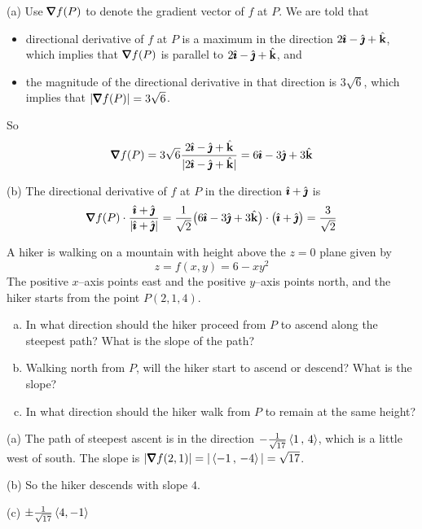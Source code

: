 \begin{solution}
(a)  Use $\vnabla f(P)$ to denote the gradient vector of $f$
at $P$. We are told that
\begin{itemize}
\item
directional derivative  of $f$ at $P$ is a maximum in the direction 
$2\hat{\pmb{\imath}} - \hat{\pmb{\jmath}} + \hat{\mathbf{k}}$, which implies that $\vnabla f(P)$ is parallel
to $2\hat{\pmb{\imath}} - \hat{\pmb{\jmath}} + \hat{\mathbf{k}}$, and
\item
the magnitude of the directional derivative in that direction is $3\sqrt{6}$,
which implies that $|\vnabla f(P)|=3\sqrt{6}$.
\end{itemize}
So
\begin{align*}
\vnabla f(P) = 3\sqrt{6} \frac{2\hi - \hj + \hk}{|2\hi - \hj + \hk|}
             = 6\hi - 3\hj + 3\hk
\end{align*}

(b) The directional derivative of $f$ at $P$ in the direction $\hat{\pmb{\imath}}+\hat{\pmb{\jmath}}$ is
\begin{equation*}
\vnabla f(P) \cdot\frac{\hi+\hj}{|\hi+\hj|}
=\frac{1}{\sqrt{2}}\big(6\hi - 3\hj + 3\hk\big)\cdot\big(\hi+\hj\big)
=\frac{3}{\sqrt{2}}
\end{equation*}
\end{solution}

\begin{question}[M200 2006D] %
A hiker is walking on a mountain with height above the $z = 0$ plane given by
\begin{equation*}
z = f(x,y) = 6 - xy^2 
\end{equation*}
The positive $x$--axis points east and the positive $y$--axis points north, 
and the hiker starts from the point $P(2, 1, 4)$.
\begin{enumerate}[(a)]
\item
In what direction should the hiker proceed from $P$ to ascend 
along the steepest path? What is the slope of the path?
\item
Walking north from $P$, will the hiker start to ascend or descend? 
What is the slope?
\item
In what direction should the hiker walk from $P$ to remain at the same height?
\end{enumerate}
\end{question}

%

\begin{answer}
(a) The path of steepest ascent is in the direction 
$-\frac{1}{\sqrt{17}}\left< 1\,,\, 4\right>$, which is a little
west of south. The slope is
$
|\vnabla f(2,1)| = |\llt -1\,,\, -4\rgt| = \sqrt{17}
$.

(b) So the hiker descends with slope $4$.

(c) $\pm\frac{1}{\sqrt{17}}\left< 4, -1\right>$
\end{answer}

